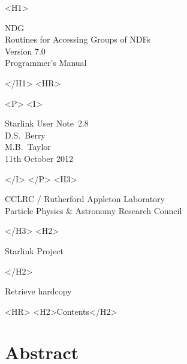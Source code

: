 \documentclass[twoside,11pt]{article}
\newcommand{\stardoccategory}  {Starlink User Note}
\newcommand{\stardocsource}    {sun\stardocnumber}
\newcommand{\stardocnumber}    {2.8}
\newcommand{\stardocauthors}   {D.S.\ Berry \\ M.B.\ Taylor}
\newcommand{\stardocdate}      {11th October 2012}
\newcommand{\stardoctitle}     {NDG \\ [\latex{1ex}]
                                Routines for Accessing Groups of NDFs}
\newcommand{\stardocversion}   {Version 7.0}
\newcommand{\stardocmanual}    {Programmer's Manual}
\newcommand{\htmladdnormallink}[2]{#1}
\newcommand{\htmladdimg}[1]{}
\newcommand{\htmlref}[2]{#1}
\newcommand{\htmladdtonavigation}[1]{}
\newcommand{\latex}[1]{#1}
\newcommand{\xlabel}[1]{}
\renewcommand{\_}{\texttt{\symbol{95}}}
\begin{document}
\begin{htmlonly}
   \xlabel{}
   \begin{rawhtml} <H1> \end{rawhtml}
      \stardoctitle\\
      \stardocversion\\
      \stardocmanual
   \begin{rawhtml} </H1> <HR> \end{rawhtml}


   \begin{rawhtml} <P> <I> \end{rawhtml}
   \stardoccategory\ \stardocnumber \\
   \stardocauthors \\
   \stardocdate
   \begin{rawhtml} </I> </P> <H3> \end{rawhtml}
      \htmladdnormallink{CCLRC / Rutherford Appleton Laboratory}
                        {http://www.cclrc.ac.uk} \\
      \htmladdnormallink{Particle Physics \& Astronomy Research Council}
                        {http://www.pparc.ac.uk} \\
   \begin{rawhtml} </H3> <H2> \end{rawhtml}
      \htmladdnormallink{Starlink Project}{http://www.starlink.ac.uk/}
   \begin{rawhtml} </H2> \end{rawhtml}
   \htmladdnormallink{\htmladdimg{source.gif} Retrieve hardcopy}
      {http://www.starlink.ac.uk/cgi-bin/hcserver?\stardocsource}\\

  \label{stardoccontents}
  \begin{rawhtml}
    <HR>
    <H2>Contents</H2>
  \end{rawhtml}
  \htmladdtonavigation{\htmlref{\htmladdimg{contents_motif.gif}}
        {stardoccontents}}

  \section{\xlabel{abstract}Abstract}
\end{htmlonly}
\end{document}

